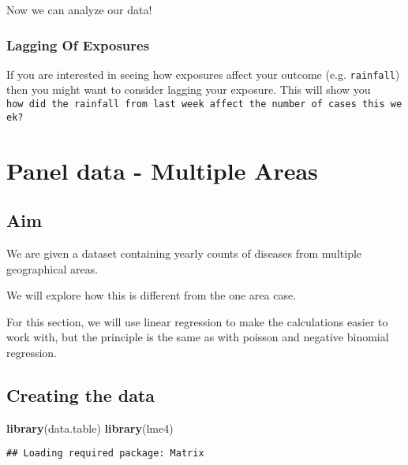 \documentclass[]{book}
\newenvironment{Shaded}{\begin{snugshade}}{\end{snugshade}}
\newcommand{\KeywordTok}[1]{\textcolor[rgb]{0.13,0.29,0.53}{\textbf{#1}}}
\newcommand{\NormalTok}[1]{#1}
\begin{document}
Now we can analyze our data!

\subsection{Lagging Of Exposures}\label{lagging-of-exposures}

If you are interested in seeing how exposures affect your outcome (e.g.
\texttt{rainfall}) then you might want to consider lagging your
exposure. This will show you
\texttt{how\ did\ the\ rainfall\ from\ last\ week\ affect\ the\ number\ of\ cases\ this\ week?}

\chapter{Panel data - Multiple Areas}\label{panel-data---multiple-areas}

\section{Aim}\label{aim-1}

We are given a dataset containing yearly counts of diseases from
multiple geographical areas.

We will explore how this is different from the one area case.

For this section, we will use linear regression to make the calculations
easier to work with, but the principle is the same as with poisson and
negative binomial regression.

\section{Creating the data}\label{creating-the-data}

\begin{Shaded}
\begin{Highlighting}[]
\KeywordTok{library}\NormalTok{(data.table)}
\KeywordTok{library}\NormalTok{(lme4)}
\end{Highlighting}
\end{Shaded}

\begin{verbatim}
## Loading required package: Matrix
\end{verbatim}
\end{document}
